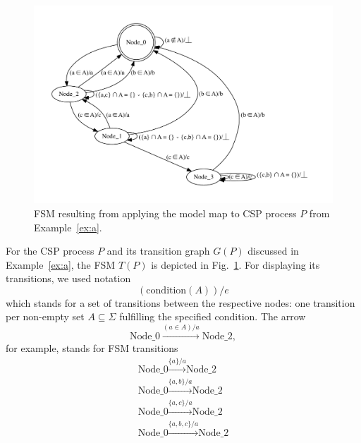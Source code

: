  \begin{figure}
 \begin{center}
\includegraphics[width=\textwidth]{fsm0.pdf}
\end{center}
\caption{FSM resulting from applying the model map to CSP process $P$ from Example~\ref{ex:a}.}
 \label{fig:fsm0}
 \end{figure}


\begin{example}\label{ex:b}
For the CSP process $P$ and its transition graph $G(P)$ discussed in Example~\ref{ex:a}, the FSM $T(P)$ is depicted in Fig.~\ref{fig:fsm0}. 
For displaying its transitions, we used notation
$$
(\text{condition}(A)) / e
$$
which stands for a set of transitions between the respective nodes: one transition per non-empty set $A\subseteq \Sigma$ fulfilling the specified condition.
The arrow 
$$
\text{Node\_0} \xrightarrow{(a\in A) / a} \text{Node\_2},
$$  
for example, stands for FSM transitions
$$
\begin{array}{l}
\text{Node\_0} \xrightarrow{\{a\}/a} \text{Node\_2} \\
\text{Node\_0} \xrightarrow{\{a,b\}/a} \text{Node\_2} \\
\text{Node\_0} \xrightarrow{\{a,c\}/a} \text{Node\_2} \\
\text{Node\_0} \xrightarrow{\{a,b,c\}/a} \text{Node\_2} \\
\end{array}
$$
\xbox
\end{example}


